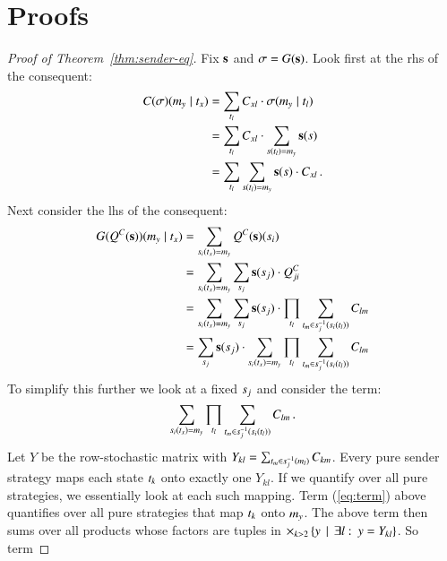 \appendix

\section{Proofs}

\begin{proof}[Proof of Theorem~\ref{thm:sender-eq}]
  Fix $\mathrm{\mathbf{s}}$ and $\sigma = G(\mathrm{\mathbf{s}})$. Look first at the rhs of
  the consequent:
  \begin{align*}
    C(\sigma)(m_y \mid t_x) & =  \sum_{t_l} C_{xl}
    \cdot \sigma(m_y \mid t_l) \\
    & =  \sum_{t_l} C_{xl}
    \cdot  \sum_{s(t_l) = m_y} \mathrm{\mathbf{s}}(s) \\
    & = \sum_{t_l}
    \sum_{s(t_l) = m_y} \mathrm{\mathbf{s}}(s) \cdot C_{xl}\,.
  \end{align*}
  Next consider the lhs of the consequent:
  \begin{align*}
    G(Q^C(\mathrm{\mathbf{s}}))(m_y \mid t_x) & =
    \sum_{s_i(t_x)=m_y} Q^C(\mathrm{\mathbf{s}})(s_i) \\
    & = \sum_{s_i(t_x)=m_y} \sum_{s_j}
    \mathrm{\mathbf{s}}(s_j) \cdot Q^C_{ji} \\
    & = \sum_{s_i(t_x)=m_y} \sum_{s_j}
    \mathrm{\mathbf{s}}(s_j) \cdot \prod_{t_l} \sum_{t_m \in
      s_j^{-1}(s_i(t_l))} C_{lm} \\
    & = \sum_{s_j} \mathrm{\mathbf{s}}(s_j) \cdot
    \sum_{s_i(t_x)=m_y} \prod_{t_l}
    \sum_{t_m \in s_j^{-1}(s_i(t_l))} C_{lm}
  \end{align*}
  To simplify this further we look at a fixed $s_j$ and consider
  the term: 
  \begin{align}
    \label{eq:term}
    \sum_{s_i(t_x)=m_y} \prod_{t_l} \sum_{t_m
      \in s_j^{-1}(s_i(t_l))} C_{lm}\,.
  \end{align}
  Let $Y$ be the row-stochastic matrix with $Y_{kl} = \sum_{t_m
    \in s_j^{-1}(m_l)} C_{km}$. Every pure sender strategy
  maps each state $t_k$ onto exactly one $Y_{kl}$. If we quantify
  over all pure strategies, we essentially look at each such
  mapping. Term (\ref{eq:term}) above quantifies over all pure
  strategies that map $t_k$ onto $m_y$. The above term then
  sums over all products whose factors are tuples in $\times_{k>2}
  \left\{y \thinspace \mid \thinspace \exists l \thinspace \colon \thinspace y = Y_{kl}\right\}$. So term

\end{proof}
